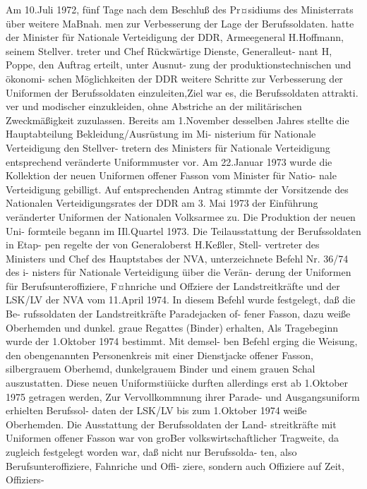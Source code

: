 

Am 10.Juli 1972, fünf Tage nach dem Beschluß des
Pr¤sidiums des Ministerrats über weitere MaBnah.
men zur Verbesserung der Lage der Berufssoldaten.
hatte der Minister für Nationale Verteidigung der
DDR, Armeegeneral H.Hoffmann, seinem Stellver.
treter und Chef Rückwärtige Dienste, Generalleut-
nant H, Poppe, den Auftrag erteilt, unter Ausnut-
zung der produktionstechnischen und ökonomi-
schen Möglichkeiten der DDR weitere Schritte zur
Verbesserung der Uniformen der Berufssoldaten
einzuleiten,Ziel war es, die Berufssoldaten attrakti.
ver und modischer einzukleiden, ohne Abstriche an
der militärischen Zweckmäßigkeit zuzulassen.
Bereits am 1.November desselben Jahres stellte
die Hauptabteilung Bekleidung/Ausrüstung im Mi-
nisterium für Nationale Verteidigung den Stellver-
tretern des Ministers für Nationale Verteidigung
entsprechend veränderte Uniformmuster vor. Am
22.Januar 1973 wurde die Kollektion der neuen
Uniformen offener Fasson vom Minister für Natio-
nale Verteidigung gebilligt. Auf entsprechenden
Antrag stimmte der Vorsitzende des Nationalen
Verteidigungsrates der DDR am 3. Mai 1973 der Einführung veränderter Uniformen der Nationalen
Volksarmee zu. Die Produktion der neuen Uni-
formteile begann im IIl.Quartel 1973.
Die Teilausstattung der Berufssoldaten in Etap-
pen regelte der von Generaloberst H.Keßler, Stell-
vertreter des Ministers und Chef des Hauptstabes
der NVA, unterzeichnete Befehl Nr. 36/74 des i-
nisters für Nationale Verteidigung üiber die Verän-
derung der Uniformen für Berufsunteroffiziere,
F¤hnriche und Offziere der Landstreitkräfte und
der LSK/LV der NVA vom 11.April 1974.
In diesem Befehl wurde festgelegt, daß die Be-
rufssoldaten der Landstreitkräfte Paradejacken of-
fener Fasson, dazu weiße Oberhemden und dunkel.
graue Regattes (Binder) erhalten, Als Tragebeginn
wurde der 1.Oktober 1974 bestimmt. Mit demsel-
ben Befehl erging die Weisung, den obengenannten
Personenkreis mit einer Dienstjacke offener Fasson,
silbergrauem Oberhemd, dunkelgrauem Binder und einem grauen Schal auszustatten. Diese neuen
Uniformstiüicke durften allerdings erst ab 1.Oktober
1975 getragen werden, Zur Vervollkommnung ihrer
Parade- und Ausgangsuniform erhielten Berufssol-
daten der LSK/LV bis zum 1.Oktober 1974 weiße
Oberhemden.
Die Ausstattung der Berufssoldaten der Land-
streitkräfte mit Uniformen offener Fasson war von
groBer volkswirtschaftlicher Tragweite, da zugleich
festgelegt worden war, daß nicht nur Berufssolda-
ten, also Berufsunteroffiziere, Fahnriche und Offi-
ziere, sondern auch Offiziere auf Zeit, Offiziers-
